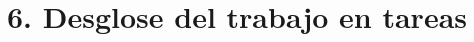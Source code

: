 \documentclass[11pt]{charter}
\begin{document}


\section{6. Desglose del trabajo en tareas}
\label{sec:wbs}




\end{document}
